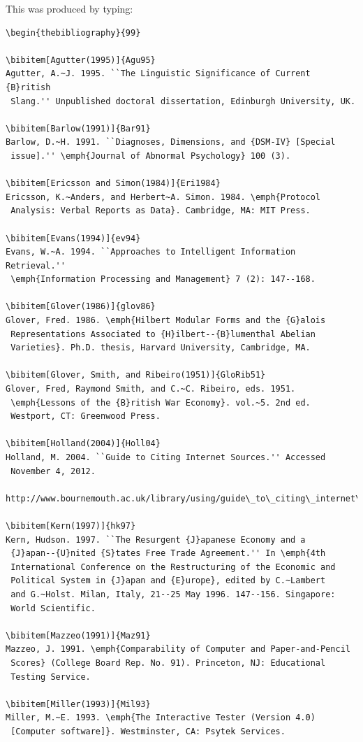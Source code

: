 \documentclass{tBPS2e}
\theoremstyle{plain}
\theoremstyle{definition}
\theoremstyle{remark}
\begin{document}
\bigskip
\noindent This was produced by typing:
\begin{verbatim}
\begin{thebibliography}{99}

\bibitem[Agutter(1995)]{Agu95}
Agutter, A.~J. 1995. ``The Linguistic Significance of Current {B}ritish 
 Slang.'' Unpublished doctoral dissertation, Edinburgh University, UK.

\bibitem[Barlow(1991)]{Bar91}
Barlow, D.~H. 1991. ``Diagnoses, Dimensions, and {DSM-IV} [Special
 issue].'' \emph{Journal of Abnormal Psychology} 100 (3).

\bibitem[Ericsson and Simon(1984)]{Eri1984}
Ericsson, K.~Anders, and Herbert~A. Simon. 1984. \emph{Protocol
 Analysis: Verbal Reports as Data}. Cambridge, MA: MIT Press.

\bibitem[Evans(1994)]{ev94}
Evans, W.~A. 1994. ``Approaches to Intelligent Information Retrieval.''
 \emph{Information Processing and Management} 7 (2): 147--168.

\bibitem[Glover(1986)]{glov86}
Glover, Fred. 1986. \emph{Hilbert Modular Forms and the {G}alois 
 Representations Associated to {H}ilbert--{B}lumenthal Abelian 
 Varieties}. Ph.D. thesis, Harvard University, Cambridge, MA.

\bibitem[Glover, Smith, and Ribeiro(1951)]{GloRib51}
Glover, Fred, Raymond Smith, and C.~C. Ribeiro, eds. 1951.
 \emph{Lessons of the {B}ritish War Economy}. vol.~5. 2nd ed.
 Westport, CT: Greenwood Press.

\bibitem[Holland(2004)]{Holl04}
Holland, M. 2004. ``Guide to Citing Internet Sources.'' Accessed
 November 4, 2012.
 http://www.bournemouth.ac.uk/library/using/guide\_to\_citing\_internet\_sourc.html.

\bibitem[Kern(1997)]{hk97}
Kern, Hudson. 1997. ``The Resurgent {J}apanese Economy and a
 {J}apan--{U}nited {S}tates Free Trade Agreement.'' In \emph{4th
 International Conference on the Restructuring of the Economic and
 Political System in {J}apan and {E}urope}, edited by C.~Lambert
 and G.~Holst. Milan, Italy, 21--25 May 1996. 147--156. Singapore:
 World Scientific.

\bibitem[Mazzeo(1991)]{Maz91}
Mazzeo, J. 1991. \emph{Comparability of Computer and Paper-and-Pencil
 Scores} (College Board Rep. No. 91). Princeton, NJ: Educational
 Testing Service.

\bibitem[Miller(1993)]{Mil93}
Miller, M.~E. 1993. \emph{The Interactive Tester (Version 4.0)
 [Computer software]}. Westminster, CA: Psytek Services.


\end{verbatim}
\end{document}
